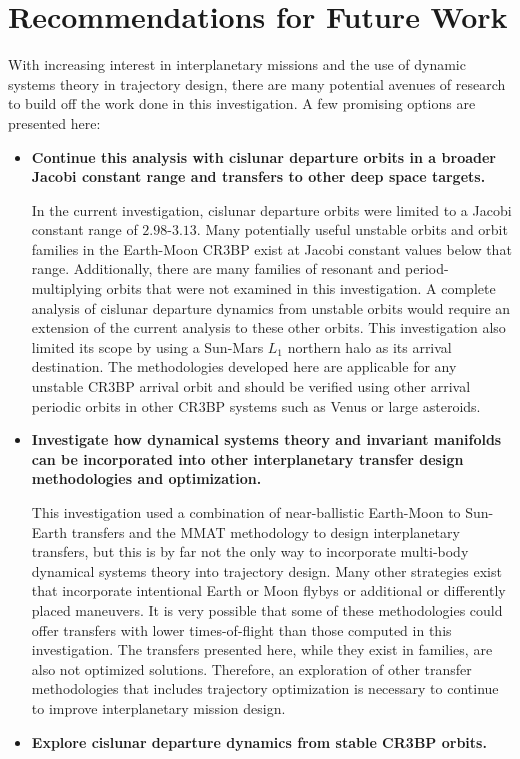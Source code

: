 \section{Recommendations for Future Work}
With increasing interest in interplanetary missions and the use of dynamic systems theory in
trajectory design, there are many potential avenues of research to build off the work done in this
investigation. A few promising options are presented here:
\begin{itemize}
    \item   \textbf{Continue this analysis with cislunar departure orbits in a broader Jacobi
            constant range and transfers to other deep space targets.}

            In the current investigation, cislunar departure orbits were limited to a Jacobi
            constant range of $2.98$-$3.13$. Many potentially useful unstable orbits and orbit
            families in the Earth-Moon CR3BP exist at Jacobi constant values below that range.
            Additionally, there are many families of resonant and period-multiplying orbits that
            were not examined in this investigation. A complete analysis of cislunar departure
            dynamics from unstable orbits would require an extension of the current analysis to
            these other orbits. This investigation also limited its scope by using a Sun-Mars
            $L_{1}$ northern halo as its arrival destination. The methodologies developed here
            are applicable for any unstable CR3BP arrival orbit and should be verified using
            other arrival periodic orbits in other CR3BP systems such as Venus or large asteroids. 
    \item   \textbf{Investigate how dynamical systems theory and invariant manifolds can be
            incorporated into other interplanetary transfer design methodologies and optimization.}

            This investigation used a combination of near-ballistic Earth-Moon to Sun-Earth
            transfers and the MMAT methodology to design interplanetary transfers, but this is by
            far not the only way to incorporate multi-body dynamical systems theory into trajectory
            design. Many other strategies exist that incorporate intentional Earth or Moon flybys
            or additional or differently placed maneuvers. It is very possible that some of these
            methodologies could offer transfers with lower times-of-flight than those computed in
            this investigation. The transfers presented here, while they exist in families, are
            also not optimized solutions. Therefore, an exploration of other transfer methodologies
            that includes trajectory optimization is necessary to continue to improve
            interplanetary mission design.
    \item   \textbf{Explore cislunar departure dynamics from stable CR3BP orbits.}
    

\end{itemize}
